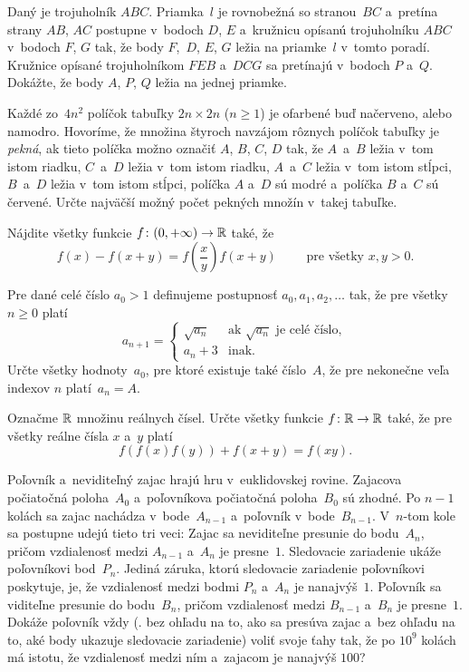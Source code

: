 {%
Daný je trojuholník $ABC$. Priamka~$l$ je rovnobežná so stranou~$BC$ a~pretína strany $AB$, $AC$ postupne v~bodoch $D$, $E$ a~kružnicu opísanú trojuholníku $ABC$ v~bodoch $F$, $G$ tak, že body $F$,~$D$, $E$, $G$ ležia na priamke~$l$ v~tomto poradí. Kružnice opísané trojuholníkom $FEB$ a~$DCG$ sa pretínajú v~bodoch $P$ a~$Q$. Dokážte, že body $A$, $P$, $Q$ ležia na jednej priamke.}

{%
Každé zo~$4n^2$ políčok tabuľky $2n\times 2n$ ($n\ge 1$) je ofarbené buď načerveno, alebo namodro. Hovoríme, že množina štyroch navzájom rôznych políčok tabuľky je {\it pekná}, ak tieto políčka možno označiť $A$, $B$, $C$, $D$ tak, že $A$~a~$B$ ležia v~tom istom riadku, $C$~a~$D$ ležia v~tom istom riadku, $A$~a~$C$ ležia v~tom istom stĺpci, $B$~a~$D$ ležia v~tom istom stĺpci, políčka $A$ a~$D$ sú modré a~políčka $B$ a~$C$ sú červené. Určte najväčší možný počet pekných množín v~takej tabuľke.}

{%
Nájdite všetky funkcie $f\colon (0,+\infty)\to\Bbb{R}$ také, že
$$ f(x)-f(x+y)=f\left(\frac xy\right)f(x+y)
\qquad \text{ pre všetky $x,y>0$.}
$$}

{%
Pre dané celé číslo $a_0 > 1$ definujeme postupnosť $a_0,a_1,a_2,\dots$ tak, že pre všetky $n \ge 0$ platí
$$
a_{n+1} = \begin{cases}
\sqrt{a_n} & \text{ak } \sqrt{a_n} \text{ je celé číslo}, \\
a_n + 3 & \text{inak.}
\end{cases}
$$
Určte všetky hodnoty~$a_0$, pre ktoré existuje také číslo~$A$, že pre nekonečne veľa indexov $n$ platí~$a_n = A$.}

{%
Označme $\Bbb R$ množinu reálnych čísel. Určte všetky funkcie $f  \colon  \Bbb R \to \Bbb R$ také, že pre všetky reálne čísla $x$ a~$y$ platí
$$
f \left( f(x) f(y) \right) + f(x+y) = f(xy).
$$}

{%
Poľovník a~neviditeľný zajac hrajú hru v~euklidovskej rovine. Zajacova počiatočná poloha~$A_0$ a~poľovníkova počiatočná poloha~$B_0$ sú zhodné. Po $n-1$ kolách sa zajac nachádza v~bode~$A_{n-1}$ a~poľovník v~bode~$B_{n-1}$. V~$n$-tom kole sa postupne udejú tieto tri veci:
Zajac sa neviditeľne presunie do bodu~$A_n$, pričom vzdialenosť medzi $A_{n-1}$ a~$A_n$ je presne~$1$.
Sledovacie zariadenie ukáže poľovníkovi bod~$P_n$. Jediná záruka, ktorú sledovacie zariadenie poľovníkovi poskytuje, je, že vzdialenosť medzi bodmi $P_n$ a~$A_n$ je nanajvýš~$1$.
Poľovník sa viditeľne presunie do bodu~$B_n$, pričom vzdialenosť medzi $B_{n-1}$ a~$B_n$ je presne~$1$.
\endgraf\noindent
Dokáže poľovník vždy (\tj. bez ohľadu na to, ako sa presúva zajac a~bez ohľadu na to, aké body ukazuje sledovacie zariadenie) voliť svoje ťahy tak, že po $10^9$ kolách má istotu, že vzdialenosť medzi ním a~zajacom je nanajvýš $100$?}

